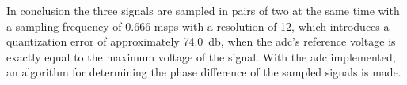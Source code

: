 In conclusion the three signals are sampled in pairs of two at the same time with a sampling frequency of 0.666 \gls{msps} with a resolution of \SI{12}{\bit}, which introduces a quantization error of approximately \SI{74,0}{\decibel}, when the \gls{adc}'s reference voltage is exactly equal to the maximum voltage of the signal. With the \gls{adc} implemented, an algorithm for determining the phase difference of the sampled signals is made.